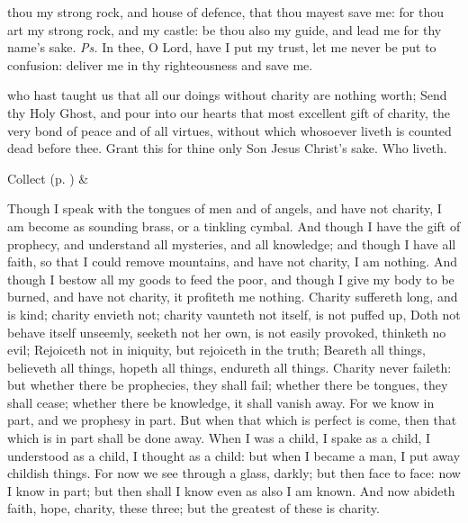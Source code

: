 

\introit
{} thou my strong rock, and house of defence, that thou mayest save me: for thou art my strong rock, and my castle: be thou also my guide, and lead me for thy name's sake. \textit{Ps.} In thee, O Lord, have I put my trust, let me never be put to confusion: deliver me in thy righteousness and save me.

\collect
{} who hast taught us that all our doings without charity are nothing worth; Send thy Holy Ghost, and pour into our hearts that most excellent gift of charity, the very bond of peace and of all virtues, without which whosoever liveth is counted dead before thee. Grant this for thine only Son Jesus Christ's sake. Who liveth.
\begin{rubric}
     Collect  (p. \pageref{SPSaints}) \&  
\end{rubric}

 Though I speak with the tongues of men and of angels, and have not charity, I am become as sounding brass, or a tinkling cymbal. And though I have the gift of prophecy, and understand all mysteries, and all knowledge; and though I have all faith, so that I could remove mountains, and have not charity, I am nothing. And though I bestow all my goods to feed the poor, and though I give my body to be burned, and have not charity, it profiteth me nothing. Charity suffereth long, and is kind; charity envieth not; charity vaunteth not itself, is not puffed up, Doth not behave itself unseemly, seeketh not her own, is not easily provoked, thinketh no evil; Rejoiceth not in iniquity, but rejoiceth in the truth; Beareth all things, believeth all things, hopeth all things, endureth all things. Charity never faileth: but whether there be prophecies, they shall fail; whether there be tongues, they shall cease; whether there be knowledge, it shall vanish away. For we know in part, and we prophesy in part. But when that which is perfect is come, then that which is in part shall be done away. When I was a child, I spake as a child, I understood as a child, I thought as a child: but when I became a man, I put away childish things. For now we see through a glass, darkly; but then face to face: now I know in part; but then shall I know even as also I am known. And now abideth faith, hope, charity, these three; but the greatest of these is charity.

